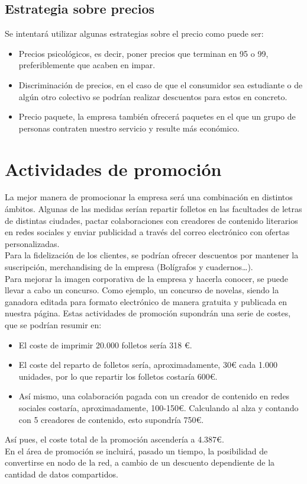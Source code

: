 \documentclass[openany,overnay,a4paper, twoside, 12pt]{book}
\begin{document}
\subsection{Estrategia sobre precios}
Se intentará utilizar algunas estrategias sobre el precio como puede ser:
\begin{itemize}
\item Precios psicológicos, es decir, poner precios que terminan en 95 o 99, preferiblemente que acaben en impar.
\item Discriminación de precios, en el caso de que el consumidor sea estudiante o de algún otro colectivo se podrían realizar descuentos para estos en concreto.
\item Precio paquete, la empresa también ofrecerá paquetes en el que un grupo de personas contraten nuestro servicio y resulte más económico.
\end{itemize}

\section{Actividades de promoción} 
La mejor manera de promocionar la empresa será una combinación en distintos ámbitos.
Algunas de las medidas serían repartir folletos en las facultades de letras de distintas ciudades, pactar colaboraciones con creadores de contenido literarios en redes sociales y enviar publicidad a través del correo electrónico con ofertas personalizadas.
\\Para la fidelización de los clientes, se podrían ofrecer descuentos por mantener la suscripción, merchandising de la empresa (Bolígrafos y cuadernos…).
\\Para mejorar la imagen corporativa de la empresa y hacerla conocer, se puede llevar a cabo un concurso. Como ejemplo, un concurso de novelas, siendo la ganadora editada para formato electrónico de manera gratuita y publicada en nuestra página.
Estas actividades de promoción supondrán una serie de costes, que se podrían resumir en:
\begin{itemize}
\item El coste de imprimir 20.000 folletos sería 318 €.
\item El coste del reparto de folletos sería, aproximadamente, 30€ cada 1.000 unidades, por lo que repartir los folletos costaría 600€.
\item Así mismo, una colaboración pagada con un creador de contenido en redes sociales costaría, aproximadamente, 100-150€. Calculando al alza y contando con 5 creadores de contenido, esto supondría 750€.
\end{itemize}
Así pues, el coste total de la promoción ascendería a 4.387€.
\\
En el área de promoción se incluirá, pasado un tiempo, la posibilidad de convertirse en nodo de la red, a cambio de un descuento dependiente de la cantidad de datos compartidos. 
\end{document}
